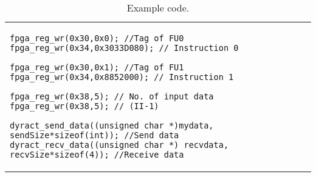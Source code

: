 \lstset{framesep=-10pt, xleftmargin=-10pt}

\begin{table}[!h]
	\centering
	\caption{Example code.}
	\label{program}
	\begin{tabular}{l}
		\begin{lstlisting}
fpga_reg_wr(0x30,0x0); //Tag of FU0 
fpga_reg_wr(0x34,0x3033D080); // Instruction 0
		
fpga_reg_wr(0x30,0x1); //Tag of FU1
fpga_reg_wr(0x34,0x8852000); // Instruction 1
		
fpga_reg_wr(0x38,5); // No. of input data
fpga_reg_wr(0x38,5); // (II-1)
		
dyract_send_data((unsigned char *)mydata, sendSize*sizeof(int)); //Send data
dyract_recv_data((unsigned char *) recvdata, recvSize*sizeof(4)); //Receive data
		\end{lstlisting}\\
	\end{tabular}
\end{table}
